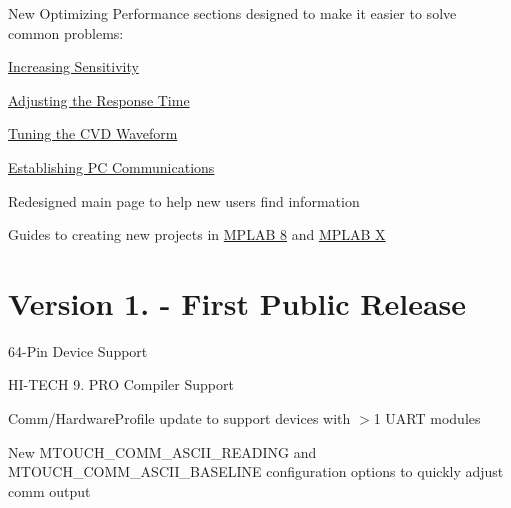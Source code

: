 \begin{DoxyItemize}
\begin{DoxyItemize}
\item New \textquotesingle{}Optimizing Performance\textquotesingle{} sections designed to make it easier to solve common problems\+: 
\begin{DoxyItemize}
\item \hyperlink{ts-Sensitivity}{Increasing Sensitivity} 
\item \hyperlink{ts-ResponseTime}{Adjusting the Response Time} 
\item \hyperlink{ts-Waveform}{Tuning the C\+V\+D Waveform} 
\item \hyperlink{ts-Comms}{Establishing P\+C Communications} 
\end{DoxyItemize}
\item Redesigned main page to help new users find information 
\item Guides to creating new projects in \hyperlink{GettingStartedNewP8}{M\+P\+L\+A\+B 8} and \hyperlink{GettingStartedNewPX}{M\+P\+L\+A\+B X} 
\end{DoxyItemize}\end{DoxyItemize}
\hypertarget{_changelog_cl0100}{}\section{Version 1. -\/ First Public Release}\label{_changelog_cl0100}
\begin{DoxyItemize}
\item 64-\/\+Pin Device Support \item H\+I-\/\+T\+E\+C\+H 9. P\+R\+O Compiler Support \item Comm/\+Hardware\+Profile update to support devices with $>$1 U\+A\+R\+T modules \item New M\+T\+O\+U\+C\+H\+\_\+\+C\+O\+M\+M\+\_\+\+A\+S\+C\+I\+I\+\_\+\+R\+E\+A\+D\+I\+N\+G and M\+T\+O\+U\+C\+H\+\_\+\+C\+O\+M\+M\+\_\+\+A\+S\+C\+I\+I\+\_\+\+B\+A\+S\+E\+L\+I\+N\+E configuration options to quickly adjust comm output \end{DoxyItemize}
